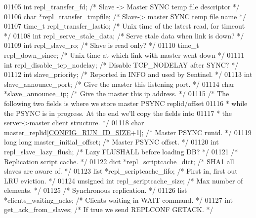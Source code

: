 \begin{DoxyCode}
{{{{{{{01105     \textcolor{keywordtype}{int} repl\_transfer\_fd;    \textcolor{comment}{/* Slave -> Master SYNC temp file descriptor */}
01106     \textcolor{keywordtype}{char} *repl\_transfer\_tmpfile; \textcolor{comment}{/* Slave-> master SYNC temp file name */}
01107     time\_t repl\_transfer\_lastio; \textcolor{comment}{/* Unix time of the latest read, for timeout */}
01108     \textcolor{keywordtype}{int} repl\_serve\_stale\_data; \textcolor{comment}{/* Serve stale data when link is down? */}
01109     \textcolor{keywordtype}{int} repl\_slave\_ro;          \textcolor{comment}{/* Slave is read only? */}
01110     time\_t repl\_down\_since; \textcolor{comment}{/* Unix time at which link with master went down */}
01111     \textcolor{keywordtype}{int} repl\_disable\_tcp\_nodelay;   \textcolor{comment}{/* Disable TCP\_NODELAY after SYNC? */}
01112     \textcolor{keywordtype}{int} slave\_priority;             \textcolor{comment}{/* Reported in INFO and used by Sentinel. */}
01113     \textcolor{keywordtype}{int} slave\_announce\_port;        \textcolor{comment}{/* Give the master this listening port. */}
01114     \textcolor{keywordtype}{char} *slave\_announce\_ip;        \textcolor{comment}{/* Give the master this ip address. */}
01115     \textcolor{comment}{/* The following two fields is where we store master PSYNC replid/offset}
01116 \textcolor{comment}{     * while the PSYNC is in progress. At the end we'll copy the fields into}
01117 \textcolor{comment}{     * the server->master client structure. */}
01118     \textcolor{keywordtype}{char} master\_replid[\hyperlink{server_8h_aba6794fa3ee28f85165eaed93190f1df}{CONFIG\_RUN\_ID\_SIZE}+1];  \textcolor{comment}{/* Master PSYNC runid. */}
01119     \textcolor{keywordtype}{long} \textcolor{keywordtype}{long} master\_initial\_offset;           \textcolor{comment}{/* Master PSYNC offset. */}
01120     \textcolor{keywordtype}{int} repl\_slave\_lazy\_flush;          \textcolor{comment}{/* Lazy FLUSHALL before loading DB? */}
01121     \textcolor{comment}{/* Replication script cache. */}
01122     dict *repl\_scriptcache\_dict;        \textcolor{comment}{/* SHA1 all slaves are aware of. */}
01123     list *repl\_scriptcache\_fifo;        \textcolor{comment}{/* First in, first out LRU eviction. */}
01124     \textcolor{keywordtype}{unsigned} \textcolor{keywordtype}{int} repl\_scriptcache\_size; \textcolor{comment}{/* Max number of elements. */}
01125     \textcolor{comment}{/* Synchronous replication. */}
01126     list *clients\_waiting\_acks;         \textcolor{comment}{/* Clients waiting in WAIT command. */}
01127     \textcolor{keywordtype}{int} get\_ack\_from\_slaves;            \textcolor{comment}{/* If true we send REPLCONF GETACK. */}
}}}}}}}
\end{DoxyCode}
